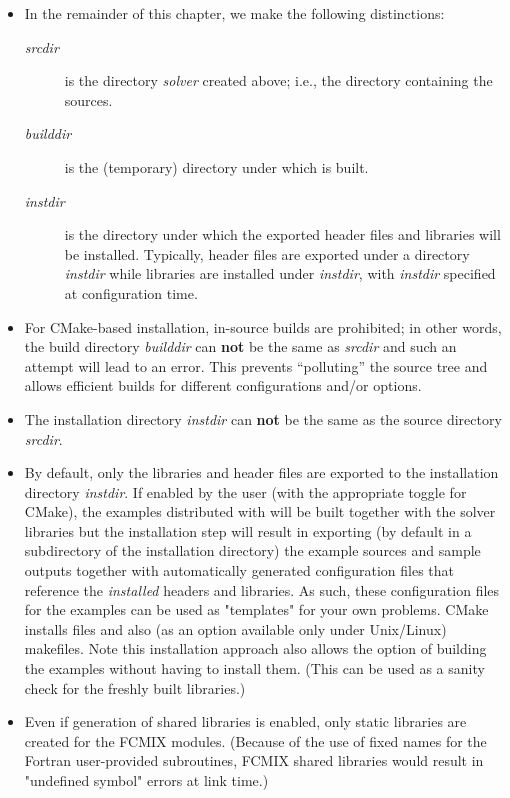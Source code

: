 \begin{itemize}

\item In the remainder of this chapter, we make the following distinctions:
  \begin{description}
  \item[{\em srcdir}] 
    is the directory {\em solver} created above; i.e., the 
    directory containing the {\sundials} sources.
  \item[{\em builddir}]
    is the (temporary) directory under which {\sundials} is built.
  \item[{\em instdir}]
    is the directory under which the {\sundials} exported header files
    and libraries will be installed. Typically, header files are exported under a directory
    {\em instdir} while libraries are installed under {\em instdir},
    with {\em instdir} specified at configuration time.
  \end{description}

\item For {\sundials} CMake-based installation, in-source builds are prohibited; in other words, the
  build directory {\em builddir} can {\bf not} be the same as {\em srcdir}
  and such an attempt will lead to an error. This
  prevents ``polluting'' the source tree and allows efficient builds
  for different configurations and/or options.

\item {\warn}The installation directory {\em instdir} can {\bf not} be the same as
  the source directory {\em srcdir}.

\item By default, only the libraries and header files are exported to the installation
  directory {\em instdir}.  If enabled by the user (with the
  appropriate toggle for CMake), the
  examples distributed with {\sundials} will be built together with
  the solver libraries but the installation step will result in
  exporting (by default in a subdirectory of the installation
  directory) the example sources and sample outputs together with
  automatically generated configuration files that reference the {\em
  installed} {\sundials} headers and libraries.  As such, these
  configuration files for the {\sundials} examples can be used as
  "templates" for your own problems. CMake installs  files and also
  (as an option available only under Unix/Linux) makefiles. Note this
  installation approach also allows the option of building the
  {\sundials} examples without having to install them.  (This can be
  used as a sanity check for the freshly built libraries.)

\item Even if generation of shared libraries is enabled, only static libraries
  are created for the FCMIX modules.  (Because of the use of fixed names for
  the Fortran user-provided subroutines, FCMIX shared libraries would result in
  "undefined symbol" errors at link time.)

\end{itemize}


